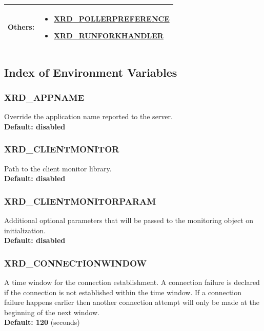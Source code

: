 \documentclass{article}
\begin{document}
\begin{center}
\begin{longtable}{ | l | p{} | }
		     {\footnotesize \textbf{Others:}} & \begin{scriptsize} 
		     \begin{itemize}
		       \item \hyperref[env:pollerpreference]{XRD_POLLERPREFERENCE}
		       \item \hyperref[env:runforkhandler]{XRD_RUNFORKHANDLER}
		     \end{itemize} 
		     \end{scriptsize} \\
		     \hline
		     
		  \end{longtable}
		\end{center}

	\subsection{Index of Environment Variables}
	\label{sec:envar}
	
		\subsubsection{XRD_APPNAME}
		\label{env:appname}
		    Override the application name reported to the server. \\
		    \textbf{Default: disabled}
		    
		\subsubsection{XRD_CLIENTMONITOR}
		\label{env:clientmonitor}
		    Path to the client monitor library. \\
		    \textbf{Default: disabled}
		
		\subsubsection{XRD_CLIENTMONITORPARAM}
		\label{env:clientmonitorparam}
		    Additional optional parameters that will be passed to the monitoring object on initialization. \\
		    \textbf{Default: disabled}
		    
		\subsubsection{XRD_CONNECTIONWINDOW}
		\label{env:connectionwindow}
			A time window for the connection establishment. A connection failure is declared if the connection is not 
			established within the time window. If a connection failure happens earlier then another connection attempt 
			will only be made at the beginning of the next window. \\
			\textbf{Default: 120} (seconds)
		
\end{document}
